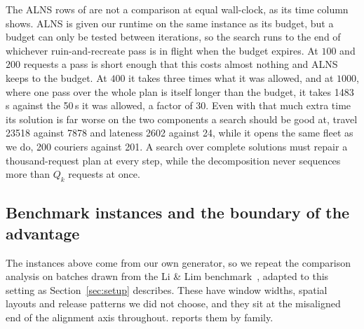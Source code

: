 The ALNS rows of  are not a comparison at equal wall-clock,
as its time column shows. ALNS is given our runtime on the same instance as its
budget, but a budget
can only be tested between iterations, so the search runs to the end of whichever
ruin-and-recreate pass is in flight when the budget expires. At
$100$ and $200$ requests a pass is short enough that this
costs almost nothing and ALNS keeps to the budget. At $400$ it takes
three times what it was allowed, and at
$1000$, where one pass over the whole plan is itself longer
than the budget, it takes 1483\,s against the
50\,s it was allowed, a factor of
30. Even
with that much extra time its solution is far worse on the two components a
search should be good at, travel 23518 against
7878 and lateness 2602 against
24, while it opens the same fleet as we do,
200 couriers against 201. A search over complete solutions
must repair a thousand-request plan at every step, while the decomposition never
sequences more than $Q_k$ requests at once.

\subsection{Benchmark instances and the boundary of the advantage}\label{sec:external}
\label{sec:lilim}
The instances above come from our own generator, so we repeat the comparison
analysis on batches drawn from the Li \& Lim benchmark~\citep{SINTEFLiLimBenchmark}, adapted to
this setting as Section~\ref{sec:setup} describes. These have window widths,
spatial layouts and release patterns we did not choose, and they sit at the
misaligned end of the alignment axis throughout.  reports
them by family.


